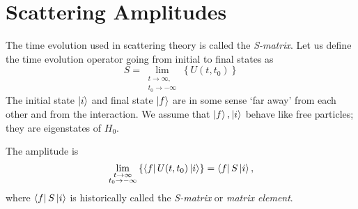 \section{Scattering Amplitudes}%
\label{sec:scattering_amplitudes}

The time evolution used in scattering theory is called the \emph{S-matrix}.
Let us define the time evolution operator going from initial to final states as
\begin{equation}
  S = \lim_{\substack{t \to \infty,\\ t_0 \to - \infty}} \left\{ U(t, t_0) \right\}
\end{equation}
The initial state $\ket{i}$ and final state $\ket{f}$ are in some sense `far away' from each other and from the interaction.
We assume that $\ket{f}, \ket{i}$ behave like free particles; they are eigenstates of $H_0$.

The amplitude is 
\begin{equation}
  \lim_{\substack{t \to \infty \\ t_0 \to - \infty}} \left\{ \bra{f} U(t, t_0) \ket{ i} \right\} = \bra{f} S \ket{i},
\end{equation}
where $\bra{ f}S \ket{ i}$ is historically called the \emph{S-matrix} or \emph{matrix element}.

